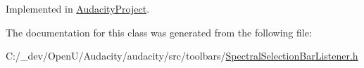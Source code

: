 Implemented in \hyperlink{class_audacity_project_ae2820f7a2bc2e9549770904209c9bf4d}{Audacity\+Project}.



The documentation for this class was generated from the following file\+:\begin{DoxyCompactItemize}
\item 
C\+:/\+\_\+dev/\+Open\+U/\+Audacity/audacity/src/toolbars/\hyperlink{_spectral_selection_bar_listener_8h}{Spectral\+Selection\+Bar\+Listener.\+h}\end{DoxyCompactItemize}
